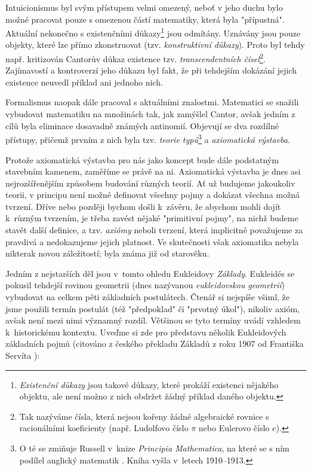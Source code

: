 Intuicionismus byl svým přístupem velmi omezený, neboť v jeho duchu bylo možné pracovat pouze s omezenou částí matematiky, která byla "přípustná". Aktuální nekonečno s existenčními důkazy\footnote{\emph{Existenční důkazy} jsou takové důkazy, které prokáží existenci nějakého objektu, ale není možno z nich obdržet žádný příklad daného objektu.} jsou odmítány. Uznávány jsou pouze objekty, které lze přímo zkonstruovat (tzv. \emph{konstruktivní důkazy}). Proto byl tehdy např. kritizován Cantorův důkaz existence tzv. \emph{transcendentních čísel}\footnote{Tak nazýváme čísla, která nejsou kořeny žádné algebraické rovnice s racionálními koeficienty (např. Ludolfovo číslo $\pi$ nebo Eulerovo číslo $e$).}. Zajímavostí a kontroverzí jeho důkazu byl fakt, že při tehdejším dokázání jejich existence neuvedl příklad ani jednoho nich.\par
Formalismus naopak dále pracoval s aktuálními znalostmi. Matematici se snažili vybudovat matematiku na množinách tak, jak zamýšlel Cantor, avšak jedním z cílů byla eliminace dosavadně známých antinomií. Objevují se dva rozdílné přístupy, přičemž prvním z nich byla tzv. \emph{teorie typů}\footnote{O té se zmiňuje Russell v~knize \emph{Principia Mathematica}, na které se s ním podílel anglický matematik . Kniha vyšla v~letech 1910--1913.} a \emph{axiomatická výstavba}.\par
Protože axiomatická výstavba pro nás jako koncept bude dále podstatným stavebním kamenem, zaměříme se právě na ni. Axiomatická výstavba je dnes asi nejrozšířenějším způsobem budování různých teorií. Ať už budujeme jakoukoliv teorii, v principu není možné definovat všechny pojmy a dokázat všechna možná tvrzení. Dříve nebo později bychom došli k~závěru, že abychom mohli dojít k~různým tvrzením, je třeba zavést nějaké "primitivní pojmy", na nichž budeme stavět další definice, a tzv. \emph{axiómy} neboli tvrzení, která implicitně považujeme za pravdivá a nedokazujeme jejich platnost. Ve skutečnosti však axiomatika nebyla nikterak novou záležitostí; byla známa již od starověku.\par
Jedním z nejstarších děl jsou v~tomto ohledu Eukleidovy \emph{Základy}. Eukleidés se pokusil tehdejší rovinou geometrii (dnes nazývanou \emph{eukleidovskou geometrií}) vybudovat na celkem pěti základních postulátech. Čtenář si nejspíše všiml, že jsme použili termín postulát (též "předpoklad" či "prvotný úkol"), nikoliv axióm, avšak není mezi nimi významný rozdíl. Většinou se tyto termíny uvádí vzhledem k~historickému kontextu. Uveďme si zde pro představu několik Eukleidových základních pojmů (citováno z českého překladu Základů z roku 1907 od Františka Servíta \cite{Eukleides1907}):
